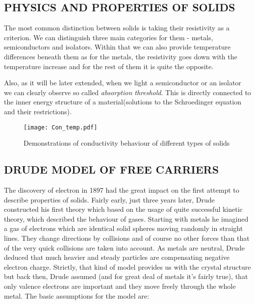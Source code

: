 
\subsection{PHYSICS AND PROPERTIES OF SOLIDS}
The most common distinction between solids is taking their resistivity as a criterion. We can distinguish three main categories for them - metals, semiconductors and isolators. Within that we can also provide temperature differences beneath them as for the metals, the resistivity goes down with the temperature increase and for the rest of them it is quite the opposite.

Also, as it will be later extended, when we light a semiconductor or an isolator we can clearly observe so called \textit{absorption threshold}. This is directly connected to the inner energy structure of a material(solutions to the Schroedinger equation and their restrictions).

\begin{figure}[H]
\centering
\texttt{[image: Con\_temp.pdf]}
\caption{Demonstrations of conductivity behaviour of different types of solids}
\end{figure}

\subsection{DRUDE MODEL OF FREE CARRIERS}
The discovery of electron in 1897 had the great impact on the first attempt to describe properties of solids. Fairly early, just three years later, Drude constructed his first theory which based on the usage of quite successful kinetic theory, which described the behaviour of gases. Starting with metals he imagined a gas of electrons which are identical solid spheres moving randomly in straight lines. They change directions by collisions and of course no other forces than that of the very quick collisions are taken into account. As metals are neutral, Drude deduced that much heavier and steady particles are compensating negative electron charge. Strictly, that kind of model provides us with the crystal structure but back then, Drude assumed (and for great deal of metals it's fairly true), that only valence electrons are important and they move freely through the whole metal. The basic assumptions for the model are:

